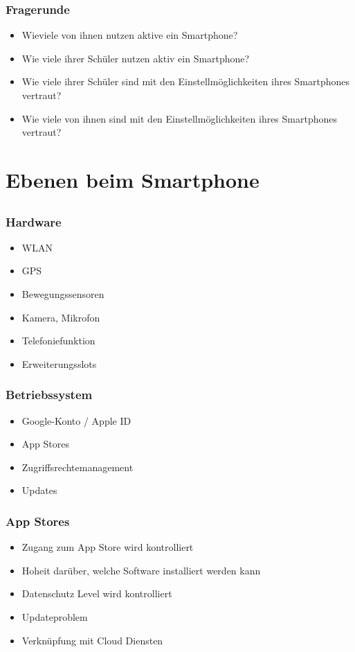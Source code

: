 \documentclass[12pt]{beamer}
\begin{document}
\begin{frame}
    \frametitle{Fragerunde}
    \begin{itemize}
	    \item<2-> Wieviele von ihnen nutzen aktive ein Smartphone?
	    \item<3-> Wie viele ihrer Schüler nutzen aktiv ein Smartphone?
	    \item<4-> Wie viele ihrer Schüler sind mit den Einstellmöglichkeiten ihres Smartphones vertraut?
	    \item<5-> Wie viele von ihnen sind mit den Einstellmöglichkeiten ihres Smartphones vertraut?
    \end{itemize}
\end{frame}

\section{Ebenen beim Smartphone}
\subsection{}

\begin{frame}
	\frametitle{Hardware}
	\begin{itemize}
		\item<2-> WLAN
		\item<3-> GPS
		\item<4-> Bewegungssensoren
		\item<5-> Kamera, Mikrofon
		\item<6-> Telefoniefunktion
		\item<7-> Erweiterungsslots
	\end{itemize}
\end{frame}

\begin{frame}
	\frametitle{Betriebssystem}
	\begin{itemize}
		\item<2-> Google-Konto / Apple ID
		\item<3-> App Stores
		\item<4-> Zugriffsrechtemanagement
		\item<5-> Updates
	\end{itemize}
\end{frame}

\begin{frame}
	\frametitle{App Stores}
	\begin{itemize}
		\item<2-> Zugang zum App Store wird kontrolliert
		\item<3-> Hoheit darüber, welche Software installiert werden kann
		\item<4-> Datenschutz Level wird kontrolliert
		\item<5-> Updateproblem
		\item<6-> Verknüpfung mit Cloud Diensten
	\end{itemize}
\end{frame}
\end{document}
